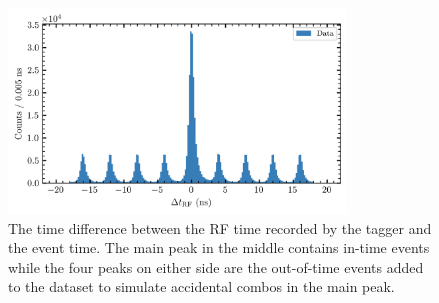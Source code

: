 \begin{figure}
  \begin{center}
    \includegraphics[width=0.8\textwidth]{figures/data_original_RF_chisqdof_3.4_protonz.png}
  \end{center}
  \caption{The time difference between the RF time recorded by the tagger and the event time. The main peak in the middle contains in-time events while the four peaks on either side are the out-of-time events added to the dataset to simulate accidental combos in the main peak.}\label{fig:delta-t-rf}
\end{figure}
